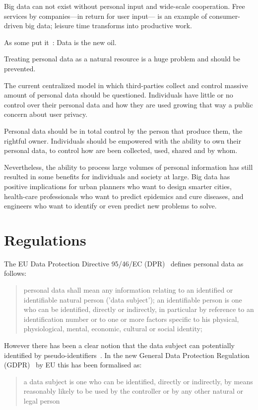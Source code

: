 Big data can not exist without personal input and wide-scale cooperation. Free services by companies---in return for user input--- is an example of consumer-driven big data; leisure time transforms into productive work.

As some put it~\cite{data_new_oil_01,data_new_oil_02,data_new_oil_03,data_new_oil_04,data_new_oil_05,data_new_oil_05,data_new_oil_06,data_new_oil_07,data_new_oil_08,data_new_oil_09}: Data is the new oil.

Treating personal data as a natural resource is a huge problem and should be prevented.

The current centralized model in which third-parties collect and control massive amount of personal data should be questioned.
Individuals have little or no control over their personal data and how they are used growing that way a public concern about
user privacy.

Personal data should be in total control by the person that produce them, the rightful owner. Individuals should be empowered
with the ability to own their personal data, to control how are been collected, used, shared and by whom.

Nevertheless, the ability to process large volumes of personal information has still resulted in some benefits for individuals and society at large. Big data has positive implications for urban planners who want to design smarter cities, health-care professionals who want to predict epidemics and cure diseases, and engineers who want to identify or even predict new problems to solve.

\section{Regulations}\label{problem:regulations}

The EU Data Protection Directive 95/46/EC (DPR)~\cite{eu-46ec-1995} defines personal data as follows:
\blockquote{
personal data shall mean any information relating to an identified or identifiable natural person ('data subject'); an identifiable person is one who can be identified, directly or indirectly, in particular by reference to an identification number or to one or more factors specific to his physical, physiological, mental, economic, cultural or social identity;
}
However there has been a clear notion that the data subject can potentially identified by pseudo-identifiers~\cite{pii}.
In the new General Data Protection Regulation (GDPR)~\cite{gdpr} by EU this has been formalised as:
\blockquote{
a data subject is one who can be identified, directly or indirectly, by means reasonably likely to be used by the controller or by any other natural or legal person
}

